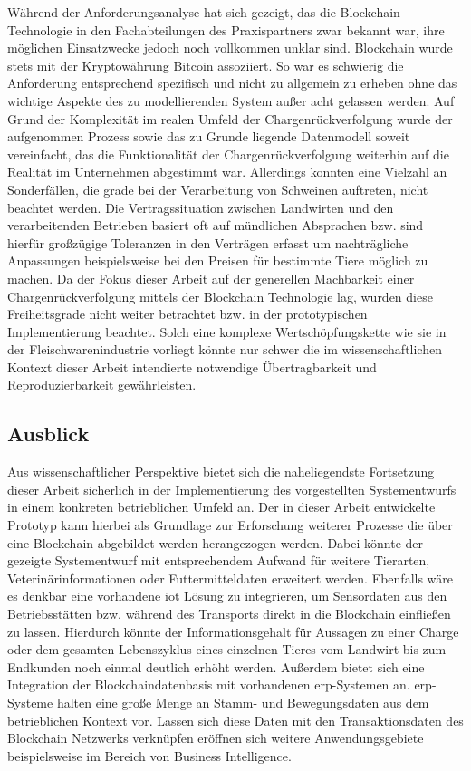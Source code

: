 Während der Anforderungsanalyse hat sich gezeigt, das die Blockchain Technologie in den Fachabteilungen des Praxispartners zwar bekannt war, ihre möglichen Einsatzwecke jedoch noch vollkommen unklar sind. Blockchain wurde stets mit der Kryptowährung Bitcoin assoziiert. So war es schwierig die Anforderung entsprechend spezifisch und nicht zu allgemein zu erheben ohne das wichtige Aspekte des zu modellierenden System außer acht gelassen werden. Auf Grund der Komplexität im realen Umfeld der Chargenrückverfolgung wurde der aufgenommen Prozess sowie das zu Grunde liegende Datenmodell soweit vereinfacht, das die Funktionalität der Chargenrückverfolgung weiterhin auf die Realität im Unternehmen abgestimmt war. Allerdings konnten eine Vielzahl an Sonderfällen, die grade bei der Verarbeitung von Schweinen auftreten, nicht beachtet werden. Die Vertragssituation zwischen Landwirten und den verarbeitenden Betrieben basiert oft auf mündlichen Absprachen bzw. sind hierfür großzügige Toleranzen in den Verträgen erfasst um nachträgliche Anpassungen beispielsweise bei den Preisen für bestimmte Tiere möglich zu machen. Da der Fokus dieser Arbeit auf der generellen Machbarkeit einer Chargenrückverfolgung mittels der Blockchain Technologie lag, wurden diese Freiheitsgrade nicht weiter betrachtet bzw. in der prototypischen Implementierung beachtet. Solch eine komplexe Wertschöpfungskette wie sie in der Fleischwarenindustrie vorliegt könnte nur schwer die im wissenschaftlichen Kontext dieser Arbeit intendierte notwendige Übertragbarkeit und Reproduzierbarkeit gewährleisten.

\subsection{Ausblick}

Aus wissenschaftlicher Perspektive bietet sich die naheliegendste Fortsetzung dieser Arbeit sicherlich in der Implementierung des vorgestellten Systementwurfs in einem konkreten betrieblichen Umfeld an. Der in dieser Arbeit entwickelte Prototyp kann hierbei als Grundlage zur Erforschung weiterer Prozesse die über eine Blockchain abgebildet werden herangezogen werden. Dabei könnte der gezeigte Systementwurf mit entsprechendem Aufwand für weitere Tierarten, Veterinärinformationen oder Futtermitteldaten erweitert werden. Ebenfalls wäre es denkbar eine vorhandene \acf{iot} Lösung zu integrieren, um Sensordaten aus den Betriebsstätten bzw. während des Transports direkt in die Blockchain einfließen zu lassen. Hierdurch könnte der Informationsgehalt für Aussagen zu einer Charge oder dem gesamten Lebenszyklus eines einzelnen Tieres vom Landwirt bis zum Endkunden noch einmal deutlich erhöht werden. Außerdem bietet sich eine Integration der Blockchaindatenbasis mit vorhandenen \ac{erp}-Systemen an. \ac{erp}-Systeme halten eine große Menge an Stamm- und Bewegungsdaten aus dem betrieblichen Kontext vor. Lassen sich diese Daten mit den Transaktionsdaten des Blockchain Netzwerks verknüpfen eröffnen sich weitere Anwendungsgebiete beispielsweise im Bereich von Business Intelligence.


\newpage
